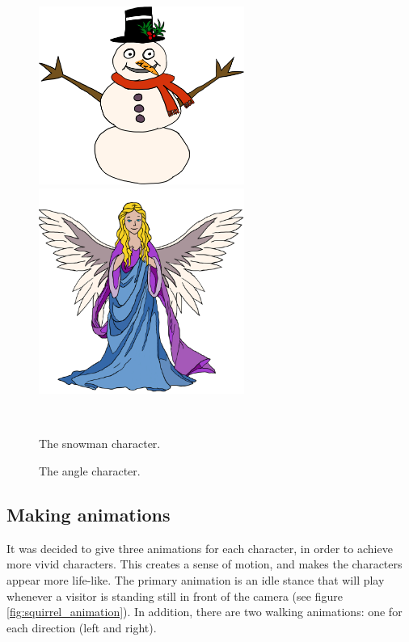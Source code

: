\begin{figure}[htbp] \centering
\begin{minipage}[b]{0.45\textwidth} \centering
\includegraphics[width=0.60\textwidth]{Pictures/Design/snowman} %
\end{minipage} \hfill
\begin{minipage}[b]{0.45\textwidth} \centering
\includegraphics[width=0.60\textwidth]{Pictures/Design/Angel} %
\end{minipage} \\ %
\begin{minipage}[t]{0.45\textwidth}
\caption{The snowman character.} %
\label{fig:PixieGirl}
\end{minipage} \hfill
\begin{minipage}[t]{0.45\textwidth}
\caption{The angle character.} %
\label{fig:Angel}
\end{minipage}
\end{figure}

\subsection{Making animations}
It was decided to give three animations for each character, in order to achieve more vivid characters. This creates a sense of motion, and makes the characters appear more life-like. The primary animation is an idle stance that will play whenever a visitor is standing still in front of the camera (see figure \ref{fig:squirrel_animation}). In addition, there are two walking animations: one for each direction (left and right).


